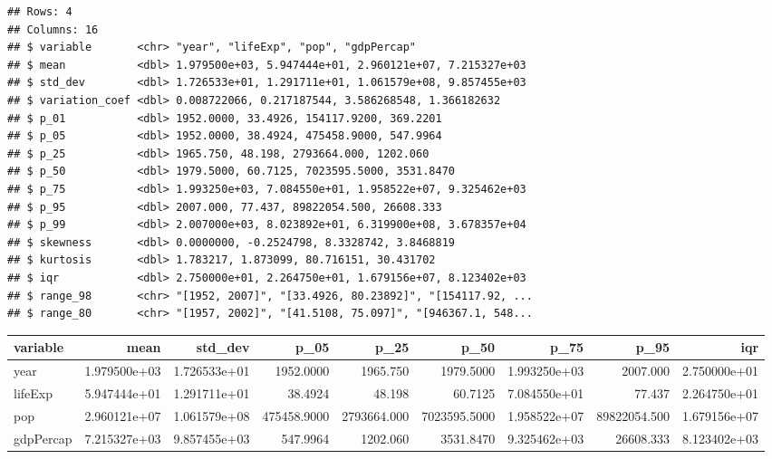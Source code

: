 \documentclass[
]{book}
\newenvironment{Shaded}{\begin{snugshade}}{\end{snugshade}}
\newcommand{\CommentTok}[1]{\textcolor[rgb]{0.56,0.35,0.01}{\textit{#1}}}
\newcommand{\KeywordTok}[1]{\textcolor[rgb]{0.13,0.29,0.53}{\textbf{#1}}}
\newcommand{\NormalTok}[1]{#1}
\newcommand{\OperatorTok}[1]{\textcolor[rgb]{0.81,0.36,0.00}{\textbf{#1}}}
\newcommand{\StringTok}[1]{\textcolor[rgb]{0.31,0.60,0.02}{#1}}
\begin{document}
\begin{verbatim}
## Rows: 4
## Columns: 16
## $ variable       <chr> "year", "lifeExp", "pop", "gdpPercap"
## $ mean           <dbl> 1.979500e+03, 5.947444e+01, 2.960121e+07, 7.215327e+03
## $ std_dev        <dbl> 1.726533e+01, 1.291711e+01, 1.061579e+08, 9.857455e+03
## $ variation_coef <dbl> 0.008722066, 0.217187544, 3.586268548, 1.366182632
## $ p_01           <dbl> 1952.0000, 33.4926, 154117.9200, 369.2201
## $ p_05           <dbl> 1952.0000, 38.4924, 475458.9000, 547.9964
## $ p_25           <dbl> 1965.750, 48.198, 2793664.000, 1202.060
## $ p_50           <dbl> 1979.5000, 60.7125, 7023595.5000, 3531.8470
## $ p_75           <dbl> 1.993250e+03, 7.084550e+01, 1.958522e+07, 9.325462e+03
## $ p_95           <dbl> 2007.000, 77.437, 89822054.500, 26608.333
## $ p_99           <dbl> 2.007000e+03, 8.023892e+01, 6.319900e+08, 3.678357e+04
## $ skewness       <dbl> 0.0000000, -0.2524798, 8.3328742, 3.8468819
## $ kurtosis       <dbl> 1.783217, 1.873099, 80.716151, 30.431702
## $ iqr            <dbl> 2.750000e+01, 2.264750e+01, 1.679156e+07, 8.123402e+03
## $ range_98       <chr> "[1952, 2007]", "[33.4926, 80.23892]", "[154117.92, ...
## $ range_80       <chr> "[1957, 2002]", "[41.5108, 75.097]", "[946367.1, 548...
\end{verbatim}

\begin{Shaded}
\end{Shaded}

\begin{tabular}{l|r|r|r|r|r|r|r|r}
\hline
variable & mean & std\_dev & p\_05 & p\_25 & p\_50 & p\_75 & p\_95 & iqr\\
\hline
year & 1.979500e+03 & 1.726533e+01 & 1952.0000 & 1965.750 & 1979.5000 & 1.993250e+03 & 2007.000 & 2.750000e+01\\
\hline
lifeExp & 5.947444e+01 & 1.291711e+01 & 38.4924 & 48.198 & 60.7125 & 7.084550e+01 & 77.437 & 2.264750e+01\\
\hline
pop & 2.960121e+07 & 1.061579e+08 & 475458.9000 & 2793664.000 & 7023595.5000 & 1.958522e+07 & 89822054.500 & 1.679156e+07\\
\hline
gdpPercap & 7.215327e+03 & 9.857455e+03 & 547.9964 & 1202.060 & 3531.8470 & 9.325462e+03 & 26608.333 & 8.123402e+03\\
\hline
\end{tabular}
\end{document}
